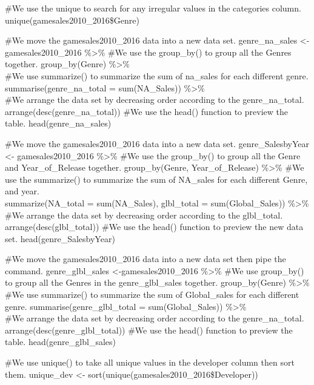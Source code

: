 \documentclass[
]{article}
\begin{document}
\#We use the unique to search for any irregular values in the categories
column. unique(gamesales2010\_2016\$Genre)

\#We move the gamesales2010\_2016 data into a new data set.
genre\_na\_sales \textless- gamesales2010\_2016 \%\textgreater\% \#We
use the group\_by() to group all the Genres together. group\_by(Genre)
\%\textgreater\%\\
\#We use summarize() to summarize the sum of na\_sales for each
different genre. summarise(genre\_na\_total = sum(NA\_Sales))
\%\textgreater\%\\
\#We arrange the data set by decreasing order according to the
genre\_na\_total. arrange(desc(genre\_na\_total)) \#We use the head()
function to preview the table. head(genre\_na\_sales)

\#We move the gamesales2010\_2016 data into a new data set.
genre\_SalesbyYear \textless- gamesales2010\_2016 \%\textgreater\% \#We
use the group\_by() to group all the Genre and Year\_of\_Release
together. group\_by(Genre, Year\_of\_Release) \%\textgreater\% \#We use
the summarize() to summarize the sum of NA\_sales for each different
Genre, and year.\\
summarize(NA\_total = sum(NA\_Sales), glbl\_total = sum(Global\_Sales))
\%\textgreater\% \#We arrange the data set by decreasing order according
to the glbl\_total. arrange(desc(glbl\_total)) \#We use the head()
function to preview the new data set. head(genre\_SalesbyYear)

\#We move the gamesales2010\_2016 data into a new data set then pipe the
command. genre\_glbl\_sales \textless-gamesales2010\_2016
\%\textgreater\% \#We use group\_by() to group all the Genres in the
genre\_glbl\_sales together. group\_by(Genre) \%\textgreater\%\\
\#We use summarize() to summarize the sum of Global\_sales for each
different genre. summarise(genre\_glbl\_total = sum(Global\_Sales))
\%\textgreater\%\\
\#We arrange the data set by decreasing order according to the
genre\_na\_total. arrange(desc(genre\_glbl\_total)) \#We use the head()
function to preview the table. head(genre\_glbl\_sales)

\#We use unique() to take all unique values in the developer column then
sort them. unique\_dev \textless-
sort(unique(gamesales2010\_2016\$Developer))
\end{document}
